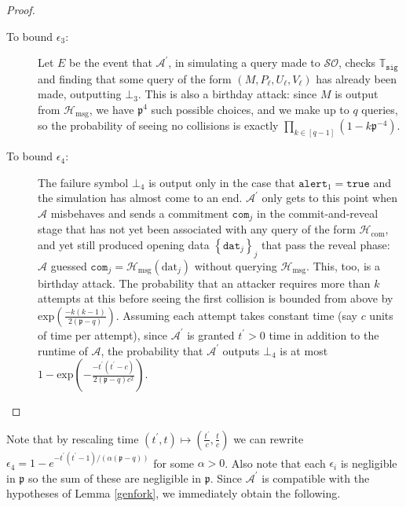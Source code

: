 \documentclass{mrl}
\theoremstyle{definition}
\numberwithin{theorem}{subsection}
\newcommand{\adversary}{\mathcal{A}}
\begin{document}
\begin{proof}
\begin{description}
\item [To bound $\epsilon_3$:] Let $E$ be the event that $\adversary^\prime$, in simulating a query made to $\mathcal{SO}$, checks $\mathbb{T}_{\texttt{sig}}$ and finding that some query of the form $(M, P_\ell, U_\ell, V_\ell)$ has already been made, outputting $\bot_3$. This is also a birthday attack: since $M$ is output from $\mathcal{H}_{\text{msg}}$, we have $\mathfrak{p}^{4}$ such possible choices, and we make up to $q$ queries, so the probability of seeing no collisions is exactly $\prod_{k \in [q-1]}(1 - k\mathfrak{p}^{-4})$.



\item [To bound $\epsilon_4$:] The failure symbol $\bot_4$ is output only in the case that $\texttt{alert}_1 = \texttt{true}$ and the simulation has almost come to an end. $\adversary^\prime$ only gets to this point when $\adversary$ misbehaves and sends a commitment $\texttt{com}_j$ in the commit-and-reveal stage that has not yet been associated with any query of the form $\mathcal{H}_{\text{com}}$, and yet still produced opening data $\left\{\texttt{dat}_j\right\}_j$ that pass the reveal phase:  $\adversary$ guessed $\texttt{com}_j = \mathcal{H}_{\text{msg}}(\text{dat}_j)$ without querying $\mathcal{H}_{\text{msg}}$. This, too, is a birthday attack. The probability that an attacker requires more than $k$ attempts at this before seeing the first collision is bounded from above by $\text{exp}(\frac{-k(k-1)}{2(\mathfrak{p}-q)})$. Assuming each attempt takes constant time (say $c$ units of time per attempt), since $\adversary^\prime$ is granted $t^\prime > 0$ time in addition to the runtime of $\adversary$, the probability that $\adversary^\prime$ outputs $\bot_4$ is at most $1 - \text{exp}(-\frac{-t^\prime(t^\prime-c)}{2(\mathfrak{p}-q)c^2})$. 




\end{description}


\end{proof}


Note that by rescaling time $(t^\prime, t) \mapsto (\frac{t^\prime}{c}, \frac{t}{c})$ we can rewrite $\epsilon_4 = 1 - e^{-t^\prime(t^\prime - 1)/(\alpha(\mathfrak{p} - q))}$ for some $\alpha > 0$.  Also note that each $\epsilon_i$ is negligible in $\mathfrak{p}$ so the sum of these are negligible in $\mathfrak{p}$. Since $\adversary^\prime$ is compatible with the hypotheses of Lemma \ref{genfork}, we immediately obtain the following.
\end{document}
